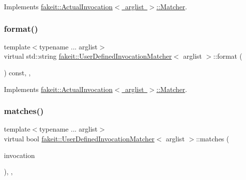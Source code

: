Implements \mbox{\hyperlink{structfakeit_1_1ActualInvocation_1_1Matcher_ae19e50f7b3a2cd2a9d6670acbaa47c32}{fakeit\+::\+Actual\+Invocation$<$ arglist $>$\+::\+Matcher}}.

\mbox{\label{structfakeit_1_1UserDefinedInvocationMatcher_a8090f8ab0af9c775f833e725f4414368}} 
\subsubsection{\texorpdfstring{format()}{format()}\hspace{0.1cm}{\footnotesize\ttfamily [9/9]}}
{\footnotesize\ttfamily template$<$typename ... arglist$>$ \\
virtual std\+::string \mbox{\hyperlink{structfakeit_1_1UserDefinedInvocationMatcher}{fakeit\+::\+User\+Defined\+Invocation\+Matcher}}$<$ arglist $>$\+::format (\begin{DoxyParamCaption}{ }\end{DoxyParamCaption}) const\hspace{0.3cm}{\ttfamily [inline]}, {\ttfamily [override]}, {\ttfamily [virtual]}}



Implements \mbox{\hyperlink{structfakeit_1_1ActualInvocation_1_1Matcher_ae19e50f7b3a2cd2a9d6670acbaa47c32}{fakeit\+::\+Actual\+Invocation$<$ arglist $>$\+::\+Matcher}}.

\mbox{\label{structfakeit_1_1UserDefinedInvocationMatcher_a52f5b5e7de4484b7e9fecb166f6b80e2}} 
\subsubsection{\texorpdfstring{matches()}{matches()}\hspace{0.1cm}{\footnotesize\ttfamily [1/9]}}
{\footnotesize\ttfamily template$<$typename ... arglist$>$ \\
virtual bool \mbox{\hyperlink{structfakeit_1_1UserDefinedInvocationMatcher}{fakeit\+::\+User\+Defined\+Invocation\+Matcher}}$<$ arglist $>$\+::matches (\begin{DoxyParamCaption}\item[{\mbox{\hyperlink{structfakeit_1_1ActualInvocation}{Actual\+Invocation}}$<$ arglist... $>$ \&}]{invocation }\end{DoxyParamCaption})\hspace{0.3cm}{\ttfamily [inline]}, {\ttfamily [override]}, {\ttfamily [virtual]}}



